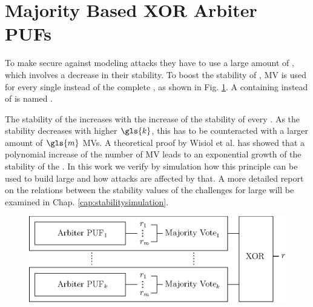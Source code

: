 
\section{Majority Based XOR Arbiter PUFs}
\label{sec:majorityxorarbiter}

To make \xpufs secure against modeling attacks they have to use a large amount of \apufs, which involves a decrease in their stability.
To boost the stability of \xpufs, \ac{MV} is used for every single \apuf instead of the complete \xpuf, as shown in Fig. \ref{fig:majorityxorarbiter}.
A \xpuf containing \mpufs instead of \apufs is named \mxpuf.

The stability of the \xpuf increases with the increase of the stability of every \mpuf.
As the stability decreases with higher $\gls{k}$, this has to be counteracted with a larger amount of $\gls{m}$ \acp{MV}.
A theoretical proof by Wisiol et al. has showed that a polynomial increase of the number of \ac{MV} leads to an exponential growth of the stability of the \mxpuf \cite{Wisiol2017WhyPUFs}.
In this work we verify by simulation how this principle can be used to build large \mxpufs and how attacks are affected by that.
A more detailed report on the relations between the stability values of the challenges for large \mxpufs will be examined in Chap. \ref{cap:stabilitysimulation}.


\begin{figure}[ht]
\centering
\includegraphics[width=1.00\textwidth]{images/majority_xor_arbiter_v2.eps}
\caption[Majority \acs{XOR} \apuf]{\mxpuf}
\label{fig:majorityxorarbiter}
\end{figure}


